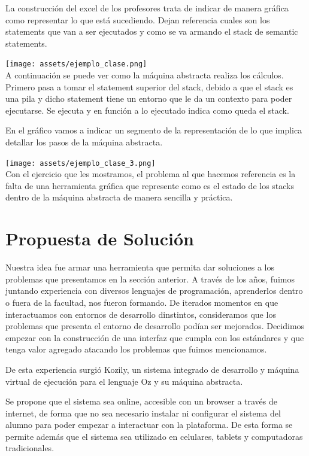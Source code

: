\documentclass[a4paper,11pt]{article}
\begin{document}
La construcción del excel de los profesores trata de indicar de manera gráfica como representar lo que está sucediendo. Dejan referencia cuales son los statements que van a ser ejecutados y como se va armando el stack de semantic statements.

\texttt{[image: assets/ejemplo\_clase.png]}\\[1cm]

A continuación se puede ver como la máquina abstracta realiza los cálculos. Primero pasa a tomar el statement superior del stack, debido a que el stack es una pila y dicho statement tiene un entorno que le da un contexto para poder ejecutarse. Se ejecuta y en función a lo ejecutado indica como queda el stack.

En el gráfico vamos a indicar un segmento de la representación de lo que implica detallar los pasos de la máquina abstracta. 

\texttt{[image: assets/ejemplo\_clase\_3.png]}\\[1cm]

Con el ejercicio que les mostramos, el problema al que hacemos referencia es la falta de una herramienta gráfica que represente como es el estado de los stacks dentro de la máquina abstracta de manera sencilla y práctica.

\section{Propuesta de Solución}

Nuestra idea fue armar una herramienta que permita dar soluciones a los problemas que presentamos en la sección anterior.
A través de los años, fuimos juntando experiencia con diversos lenguajes de programación, aprenderlos dentro o fuera de la facultad, nos fueron formando. De iterados momentos en que interactuamos con entornos de desarrollo dinstintos, consideramos que los problemas que presenta el entorno de desarrollo podían ser mejorados. Decidimos empezar con la construcción de una interfaz que cumpla con los estándares y que tenga valor agregado atacando los problemas que fuimos mencionamos.

De esta experiencia surgió Kozily, un sistema integrado de desarrollo y máquina virtual de ejecución para el lenguaje Oz y su máquina abstracta.

Se propone que el sistema sea online, accesible con un browser a través de internet, de forma que no sea necesario instalar ni configurar el sistema del alumno para poder empezar a interactuar con la plataforma. De esta forma se permite además que el sistema sea utilizado en celulares, tablets y computadoras tradicionales.
\end{document}

